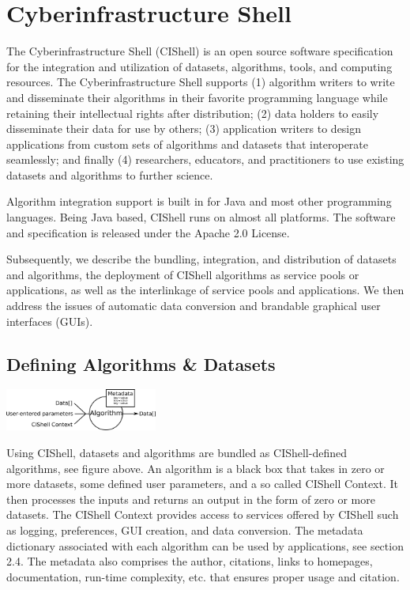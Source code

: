 \section{Cyberinfrastructure Shell}


The Cyberinfrastructure Shell (CIShell) \cite{cishell} is an open source 
software specification for the integration and utilization of datasets, 
algorithms, tools, and computing resources. The Cyberinfrastructure Shell 
supports (1) algorithm writers to write and disseminate their algorithms in 
their favorite programming language while retaining their intellectual rights 
after distribution; (2) data holders to easily disseminate their data for use 
by others; (3) application writers to design applications from custom sets of 
algorithms and datasets that interoperate seamlessly; and finally (4) 
researchers, educators, and practitioners to use existing datasets and 
algorithms to further science.

Algorithm integration support is built in for Java and most other programming 
languages. Being Java based, CIShell runs on almost all platforms. The software 
and specification is released under the Apache 2.0 License.

Subsequently, we describe the bundling, integration, and distribution of 
datasets and algorithms, the deployment of CIShell algorithms as service pools 
or applications, as well as the interlinkage of service pools and applications. 
We then address the issues of automatic data conversion and brandable graphical 
user interfaces (GUIs).

\subsection{Defining Algorithms \& Datasets}

\begin{center}
\includegraphics[width=50mm]{graphics/algorithmDefn.png} 
\end{center}

Using CIShell, datasets and algorithms are bundled as CIShell-defined 
algorithms, see figure above. An algorithm is a black box that takes in zero 
or more datasets, some defined user parameters, and a so called CIShell 
Context. It then processes the inputs and returns an output in the form of zero 
or more datasets. The CIShell Context provides access to services offered by 
CIShell such as logging, preferences, GUI creation, and data conversion. The 
metadata dictionary associated with each algorithm can be used by applications,
see section 2.4. The metadata also comprises the author, citations, links to 
homepages, documentation, run-time complexity, etc. that ensures proper usage 
and citation.

